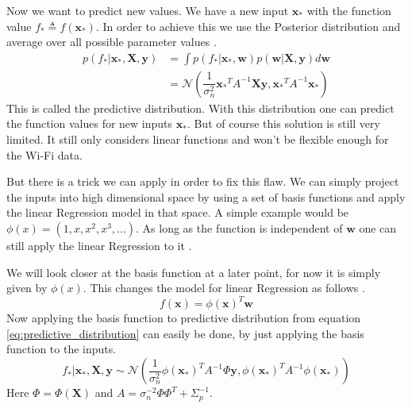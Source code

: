 Now we want to predict new values. We have a new input $\mathbf{x_*}$ with the function value $f_* \triangleq f(\mathbf{x_*})$. In order to achieve this we use the \gls{Posterior} distribution and average over all possible parameter values \citep[p.\ 11]{Rasmussen:2005:GPM:1162254}.
\begin{equation}\label{eq:predictive_distribution}
\begin{aligned}
p(f_*|\mathbf{x_*},\mathbf{X},\mathbf{y}) &= \int p(f_*|\mathbf{x_*},\mathbf{w})p(\mathbf{w}|\mathbf{X},\mathbf{y})d\mathbf{w}\\
&= \mathcal{N}(\dfrac{1}{\sigma_n^2}\mathbf{x_*}^TA^{-1}\mathbf{X}\mathbf{y},\mathbf{x_*}^TA^{-1}\mathbf{x_*})
\end{aligned}
\end{equation}
This is called the predictive distribution. With this distribution one can predict the function values for new inputs $\mathbf{x_*}$. But of course this solution is still very limited. It still only considers linear functions and won't be flexible enough for the Wi-Fi data. 

But there is a trick we can apply in order to fix this flaw. We can simply project the inputs into high dimensional space by using a set of basis functions and apply the linear \gls{Regression} model in that space. A simple example would be $\phi(x) = (1,x,x^2,x^3,...)$. As long as the function is independent of $\mathbf{w}$ one can still apply the linear \gls{Regression} to it \citep[p.\ 11]{Rasmussen:2005:GPM:1162254}.

We will look closer at the basis function at a later point, for now it is simply given by $\phi(x)$. This changes the model for linear \gls{Regression} as follows \citep[p.\ 12]{Rasmussen:2005:GPM:1162254}.
\begin{equation}\label{eq:basis_function}
f(\mathbf{x}) = \phi(\mathbf{x})^T\mathbf{w}
\end{equation}
Now applying the basis function to predictive distribution from equation \ref{eq:predictive_distribution} can easily be done, by just applying the basis function to the inputs. 
\begin{equation}\label{eq:prediction_distri_basis_function}
f_*|\mathbf{x_*},\mathbf{X},\mathbf{y} \sim \mathcal{N}(\dfrac{1}{\sigma_n^2}\phi(\mathbf{x_*})^TA^{-1}\Phi\mathbf{y}, \phi(\mathbf{x_*})^TA^{-1}\phi(\mathbf{x_*}))
\end{equation}
Here $\Phi = \Phi(\mathbf{X})$ and $A = \sigma_n^{-2}\Phi\Phi^T+\Sigma_p^{-1}$.

